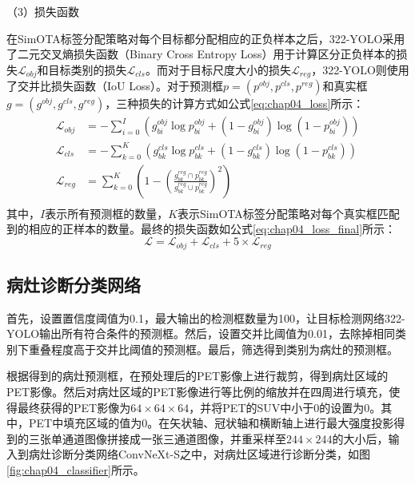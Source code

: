 （3）损失函数

在SimOTA标签分配策略对每个目标都分配相应的正负样本之后，322-YOLO采用了二元交叉熵损失函数（Binary Cross Entropy Loss）用于计算区分正负样本的损失\(\mathcal{L}_{obj}\)和目标类别的损失\(\mathcal{L}_{cls}\)。而对于目标尺度大小的损失\(\mathcal{L}_{reg}\)，322-YOLO则使用了交并比损失函数（IoU Loss）。对于预测框\(p = (p^{obj}, p^{cls}, p^{reg})\)和真实框\(g = (g^{obj}, g^{cls}, g^{reg})\)，三种损失的计算方式如公式\ref{eq:chap04_loss}所示：
\begin{equation}
  \begin{aligned}
    \mathcal{L}_{obj} & = -\sum_{i=0}^I( g^{obj}_{bi} \log p^{obj}_{bi} +  (1- g^{obj}_{bi})\log(1-p^{obj}_{bi} ))      \\
    \mathcal{L}_{cls} & = -\sum_{k=0}^K( g^{cls}_{bk} \log p^{cls}_{bk} +  (1- g^{cls}_{bk})\log(1-p^{cls}_{bk} ))      \\
    \mathcal{L}_{reg} & = \sum_{k=0}^K( 1 - (\frac{g^{reg}_{bk} \cap p^{reg}_{bk}}{g^{reg}_{bk} \cup p^{reg}_{bk}})^2 ) \\
  \end{aligned}
  \label{eq:chap04_loss}
\end{equation}
其中，\(I\)表示所有预测框的数量，\(K\)表示SimOTA标签分配策略对每个真实框匹配到的相应的正样本的数量。最终的损失函数如公式\ref{eq:chap04_loss_final}所示：
\begin{equation}
  \mathcal{L}  = \mathcal{L}_{obj} + \mathcal{L}_{cls} + 5 \times \mathcal{L}_{reg}
  \label{eq:chap04_loss_final}
\end{equation}

\subsection{病灶诊断分类网络}

首先，设置置信度阈值为0.1，最大输出的检测框数量为100，让目标检测网络322-YOLO输出所有符合条件的预测框。然后，设置交并比阈值为0.01，去除掉相同类别下重叠程度高于交并比阈值的预测框。最后，筛选得到类别为病灶的预测框。

根据得到的病灶预测框，在预处理后的PET影像上进行裁剪，得到病灶区域的PET影像。然后对病灶区域的PET影像进行等比例的缩放并在四周进行填充，使得最终获得的PET影像为\(64\times64\times64\)，并将PET的SUV中小于0的设置为0。其中，PET中填充区域的值为0。在矢状轴、冠状轴和横断轴上进行最大强度投影得到的三张单通道图像拼接成一张三通道图像，并重采样至\(244 \times 244\)的大小后，输入到病灶诊断分类网络ConvNeXt-S之中，对病灶区域进行诊断分类，如图\ref{fig:chap04_classifier}所示。

